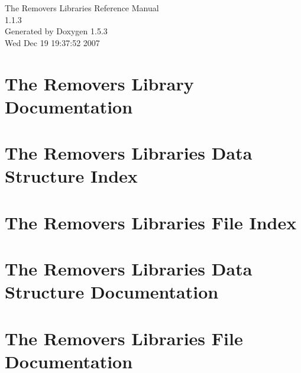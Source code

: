 \documentclass[a4paper]{book}
\begin{document}
\begin{titlepage}
\vspace*{7cm}
\begin{center}
{\Large The Removers Libraries Reference Manual\\[1ex]\large 1.1.3 }\\
\vspace*{1cm}
{\large Generated by Doxygen 1.5.3}\\
\vspace*{0.5cm}
{\small Wed Dec 19 19:37:52 2007}\\
\end{center}
\end{titlepage}
\clearemptydoublepage
{}
\tableofcontents
\clearemptydoublepage
{}
\chapter{The Removers Library Documentation }
\label{index}\hypertarget{index}{}
\chapter{The Removers Libraries Data Structure Index}

\chapter{The Removers Libraries File Index}

\chapter{The Removers Libraries Data Structure Documentation}








\chapter{The Removers Libraries File Documentation}












\printindex
\end{document}
